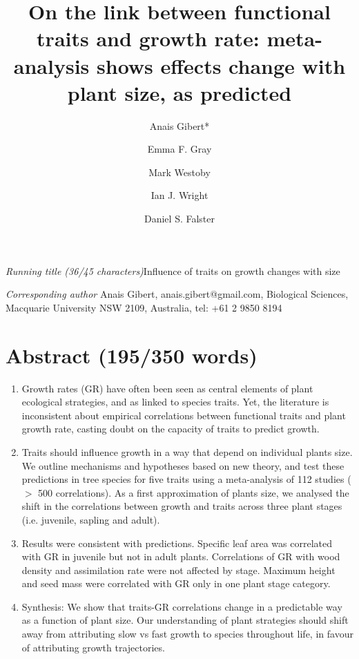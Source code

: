 \documentclass[a4paper]{article}\usepackage[]{graphicx}\usepackage[]{color}
\begin{document}
\clearpage

\title{On the link between functional traits and growth rate: meta-analysis shows effects change with plant size, as predicted}

\author[1]{Anais Gibert*}
\author[1]{Emma F. Gray}
\author[1]{Mark Westoby}
\author[1]{Ian J. Wright}
\author[1]{Daniel S. Falster}

\maketitle

\textit{Running title (36/45 characters)}Influence of traits on growth changes with size

\textit{Corresponding author} Anais Gibert, anais.gibert@gmail.com, Biological Sciences, Macquarie University NSW 2109, Australia, tel: +61 2 9850 8194


\clearpage

\section*{Abstract (195/350 words)}\label{abstract}


\begin{enumerate}

\item
Growth rates (GR) have often been seen as central elements of plant ecological strategies, and as linked to species traits. Yet, the literature is inconsistent about empirical correlations between functional traits and plant growth rate, casting doubt on the capacity of traits to predict growth.

\item
Traits should influence growth in a way that depend on individual plants size. We outline mechanisms and hypotheses based on new theory, and test these predictions in tree species for five traits using a meta-analysis of 112 studies ($>$ 500 correlations). As a first approximation of plants size, we analysed the shift in the correlations between growth and traits across three plant stages (i.e. juvenile, sapling and adult).

\item
Results were consistent with predictions. Specific leaf area was correlated with GR in juvenile but not in adult plants. Correlations of GR with wood density and assimilation rate were not affected by stage. Maximum height and seed mass were correlated with GR only in one plant stage category.

\item
Synthesis: We show that traits-GR correlations change in a predictable way as a function of plant size. Our understanding of plant strategies should shift away from attributing slow vs fast growth to species throughout life, in favour of attributing growth trajectories.

\end{enumerate}
\end{document}
